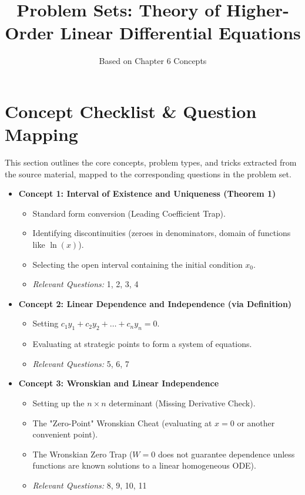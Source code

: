 \documentclass[12pt]{article}
\title{Problem Sets: Theory of Higher-Order Linear Differential Equations}
\author{Based on Chapter 6 Concepts}
\date{}
\begin{document}
\maketitle
\tableofcontents
\newpage

\section{Concept Checklist \& Question Mapping}
This section outlines the core concepts, problem types, and tricks extracted from the source material, mapped to the corresponding questions in the problem set.

\begin{itemize}
    \item \textbf{Concept 1: Interval of Existence and Uniqueness (Theorem 1)}
    \begin{itemize}
        \item Standard form conversion (Leading Coefficient Trap).
        \item Identifying discontinuities (zeroes in denominators, domain of functions like $\ln(x)$).
        \item Selecting the open interval containing the initial condition $x_0$.
        \item \textit{Relevant Questions:} 1, 2, 3, 4
    \end{itemize}
    
    \item \textbf{Concept 2: Linear Dependence and Independence (via Definition)}
    \begin{itemize}
        \item Setting $c_1y_1 + c_2y_2 + \dots + c_ny_n = 0$.
        \item Evaluating at strategic points to form a system of equations.
        \item \textit{Relevant Questions:} 5, 6, 7
    \end{itemize}

    \item \textbf{Concept 3: Wronskian and Linear Independence}
    \begin{itemize}
        \item Setting up the $n \times n$ determinant (Missing Derivative Check).
        \item The "Zero-Point" Wronskian Cheat (evaluating at $x=0$ or another convenient point).
        \item The Wronskian Zero Trap ($W=0$ does not guarantee dependence unless functions are known solutions to a linear homogeneous ODE).
        \item \textit{Relevant Questions:} 8, 9, 10, 11
    \end{itemize}


\end{itemize}
\end{document}
